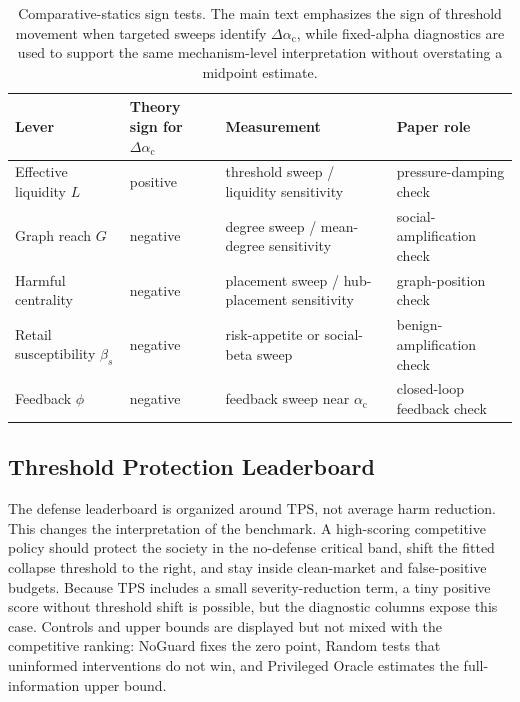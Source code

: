 \documentclass[letterpaper]{article} %
\newcommand{\alphac}{\alpha_{\mathrm{c}}}
\newcommand{\tps}{\mathrm{TPS}}
\begin{document}
\begin{table}[t]
\centering
\small
\begin{tabular}{llll}
\toprule
Lever & Theory sign for \(\Delta\alphac\) & Measurement & Paper role \\
\midrule
Effective liquidity \(L\) & positive & threshold sweep / liquidity sensitivity & pressure-damping check \\
Graph reach \(G\) & negative & degree sweep / mean-degree sensitivity & social-amplification check \\
Harmful centrality & negative & placement sweep / hub-placement sensitivity & graph-position check \\
Retail susceptibility \(\beta_s\) & negative & risk-appetite or social-beta sweep & benign-amplification check \\
Feedback \(\phi\) & negative & feedback sweep near \(\alphac\) & closed-loop feedback check \\
\bottomrule
\end{tabular}
\caption{Comparative-statics sign tests. The main text emphasizes the sign of
threshold movement when targeted sweeps identify \(\Delta\alphac\), while
fixed-alpha diagnostics are used to support the same mechanism-level
interpretation without overstating a midpoint estimate.}
\label{tab:statics}
\end{table}

\subsection{Threshold Protection Leaderboard}

The defense leaderboard is organized around \(\tps\), not average harm
reduction. This changes the interpretation of the benchmark. A high-scoring
competitive policy should protect the society in the no-defense critical band,
shift the fitted collapse threshold to the right, and stay inside clean-market
and false-positive budgets. Because \(\tps\) includes a small severity-reduction
term, a tiny positive score without threshold shift is possible, but the
diagnostic columns expose this case. Controls and upper bounds are displayed
but not mixed with the competitive ranking: NoGuard fixes the zero point,
Random tests that uninformed interventions do not win, and Privileged Oracle
estimates the full-information upper bound.
\end{document}
